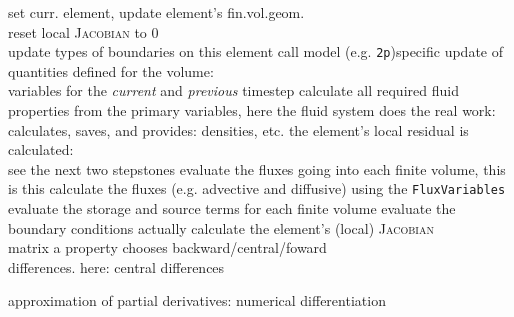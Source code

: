 \begin{landscape}
     {set curr. element, update element's fin.vol.geom.\\
      reset local \textsc{Jacobian} to 0\\
      update types of boundaries on this element}%
\shortArrow
{}%
     {call model (e.g. \texttt{2p})specific update of quantities defined for the volume:\\
      variables for the \emph{current} and \emph{previous} timestep}%
\dummyDistance
%
\noindent
{}%
     {calculate all required fluid properties from the primary variables,
      here the fluid system does the real work:\\
      calculates, saves, and provides: densities, etc.}
\shortArrow
{}%
     {the element's local residual is calculated:\\
      see the next two stepstones}%
\shortArrow
{}%
     {evaluate the fluxes going into each finite volume,
      this is \modelSpecific}
\dummyDistance
%
%
     {this calculate the \modelSpecific fluxes (e.g. advective and diffusive)
      using the \texttt{FluxVariables}}
\shortArrow
{}%
     {evaluate the \modelSpecific storage and source terms for each finite volume}%
\shortArrow
{}%
     {evaluate the \modelSpecific boundary conditions}%
\dummyDistance
%
%
     {actually calculate the element's (local) \textsc{Jacobian}\\
      matrix a property chooses backward/central/foward\\
      differences. here: central differences}
\shortArrow
\begin{minipage}{0.50\textwidth}
  \begin{scriptsize}\textnormal{approximation of partial derivatives: numerical differentiation}\end{scriptsize}\\

\end{minipage}
\end{landscape}
